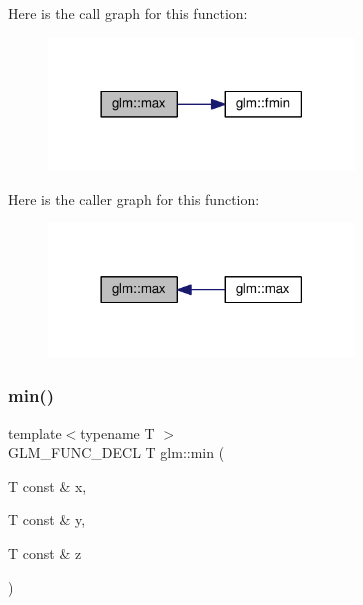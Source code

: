Here is the call graph for this function\+:
\nopagebreak
\begin{figure}[H]
\begin{center}
\leavevmode
\includegraphics[width=230pt]{df/d72/group__gtx__extended__min__max_gaacffbc466c2d08c140b181e7fd8a4858_cgraph}
\end{center}
\end{figure}
Here is the caller graph for this function\+:
\nopagebreak
\begin{figure}[H]
\begin{center}
\leavevmode
\includegraphics[width=230pt]{df/d72/group__gtx__extended__min__max_gaacffbc466c2d08c140b181e7fd8a4858_icgraph}
\end{center}
\end{figure}
\mbox{\label{group__gtx__extended__min__max_ga713d3f9b3e76312c0d314e0c8611a6a6}} 
\subsubsection{\texorpdfstring{min()}{min()}\hspace{0.1cm}{\footnotesize\ttfamily [1/6]}}
{\footnotesize\ttfamily template$<$typename T $>$ \\
G\+L\+M\+\_\+\+F\+U\+N\+C\+\_\+\+D\+E\+CL T glm\+::min (\begin{DoxyParamCaption}\item[{T const \&}]{x,  }\item[{T const \&}]{y,  }\item[{T const \&}]{z }\end{DoxyParamCaption})}



